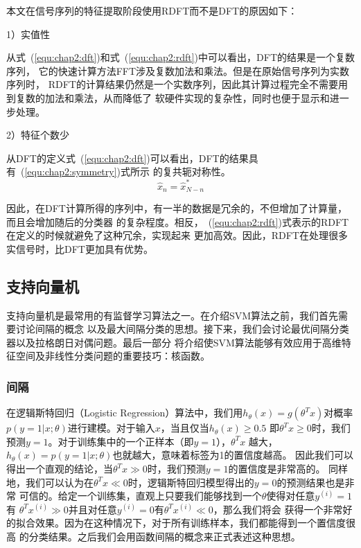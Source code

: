 本文在信号序列的特征提取阶段使用RDFT而不是DFT的原因如下：

1）实值性

从式~(\ref{equ:chap2:dft})和式~(\ref{equ:chap2:rdft})中可以看出，DFT的结果是一个复数序列，
它的快速计算方法FFT涉及复数加法和乘法。但是在原始信号序列为实数序列时，
RDFT的计算结果仍然是一个实数序列，因此其计算过程完全不需要用到复数的加法和乘法，从而降低了
软硬件实现的复杂性，同时也便于显示和进一步处理。

2）特征个数少

从DFT的定义式~(\ref{equ:chap2:dft})可以看出，DFT的结果具有~(\ref{equ:chap2:symmetry})式所示
的复共轭对称性。
\begin{equation}
\label{equ:chap2:symmetry}
  \hat{x}_n = \hat{x}^*_{N-n}
\end{equation}

因此，在DFT计算所得的序列中，有一半的数据是冗余的，不但增加了计算量，而且会增加随后的分类器
的复杂程度。相反，~(\ref{equ:chap2:rdft})式表示的RDFT在定义的时候就避免了这种冗余，实现起来
更加高效。因此，RDFT在处理很多实信号时，比DFT更加具有优势。

\subsection{支持向量机}

支持向量机是最常用的有监督学习算法之一。在介绍SVM算法之前，我们首先需要讨论间隔的概念
以及最大间隔分类的思想。接下来，我们会讨论最优间隔分类器以及拉格朗日对偶问题。最后一部分
将介绍使SVM算法能够有效应用于高维特征空间及非线性分类问题的重要技巧：核函数。

\subsubsection{间隔}

在逻辑斯特回归（Logistic Regression）算法中，我们用$h_{\theta}(x) = g(\theta^Tx)$对概率
$p(y = 1|x;\theta)$进行建模。对于输入$x$，当且仅当$h_{\theta}(x) \geq 0.5$
即$\theta^Tx \geq 0$时，我们预测$y = 1$。对于训练集中的一个正样本（即$y = 1$），$\theta^Tx$
越大，$h_{\theta}(x) = p(y = 1|x;\theta)$也就越大，意味着标签为1的置信度越高。
因此我们可以得出一个直观的结论，当$\theta^Tx \gg 0$时，我们预测$y = 1$的置信度是非常高的。
同样地，我们可以认为在$\theta^Tx \ll 0$时，逻辑斯特回归模型得出的$y = 0$的预测结果也是非常
可信的。给定一个训练集，直观上只要我们能够找到一个$\theta$使得对任意$y^{(i)} = 1$有
$\theta^Tx^{(i)} \gg 0$并且对任意$y^{(i)} = 0$有$\theta^Tx^{(i)} \ll 0$，那么我们将会
获得一个非常好的拟合效果。因为在这种情况下，对于所有训练样本，我们都能得到一个置信度很高
的分类结果。之后我们会用函数间隔的概念来正式表述这种思想。

